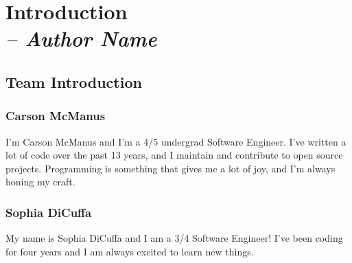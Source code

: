 \chapter{Introduction \\
  \small{\textit{-- Author Name}}
  \label{Chapter::Introduction}}

\section{Team Introduction \label{Section::TeamIntroduction}}

\subsection{Carson McManus}

I'm Carson McManus and I'm a 4/5 undergrad Software Engineer. I've written a lot of code over the past 13 years, and I maintain and contribute to open source projects. Programming is something that gives me a lot of joy, and I'm always honing my craft.

\subsection{Sophia DiCuffa}

My name is Sophia DiCuffa and I am a 3/4 Software Engineer! I've been coding for four years and I am always excited to learn new things.